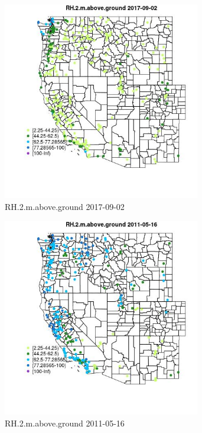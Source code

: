 \begin{figure} 
\centering  
\includegraphics[width=0.77\textwidth]{Code_Outputs/Report_ML_input_PM25_Step4_part_e_de_duplicated_aves_compiled_2019-05-20wNAs_MapObsRH2maboveground2017-09-02.jpg} 
\caption{\label{fig:Report_ML_input_PM25_Step4_part_e_de_duplicated_aves_compiled_2019-05-20wNAsMapObsRH2maboveground2017-09-02}RH.2.m.above.ground 2017-09-02} 
\end{figure} 
 

\clearpage 

\begin{figure} 
\centering  
\includegraphics[width=0.77\textwidth]{Code_Outputs/Report_ML_input_PM25_Step4_part_e_de_duplicated_aves_compiled_2019-05-20wNAs_MapObsRH2maboveground2011-05-16.jpg} 
\caption{\label{fig:Report_ML_input_PM25_Step4_part_e_de_duplicated_aves_compiled_2019-05-20wNAsMapObsRH2maboveground2011-05-16}RH.2.m.above.ground 2011-05-16} 
\end{figure} 
 


